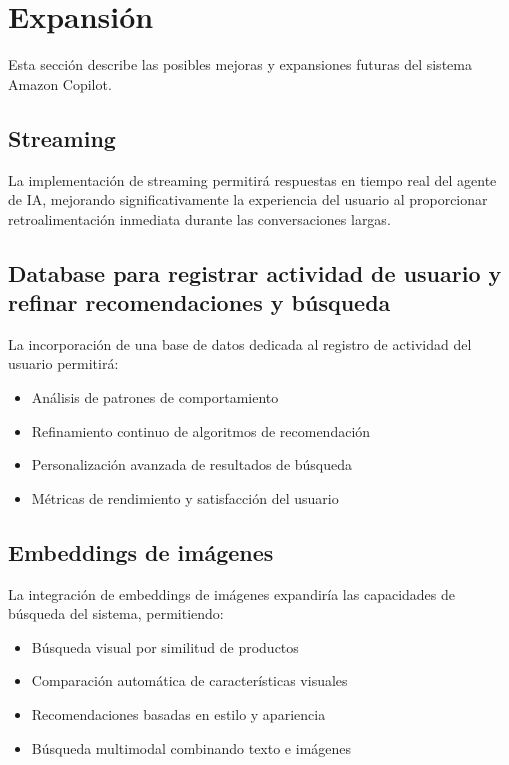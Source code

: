 \section{Expansión}

Esta sección describe las posibles mejoras y expansiones futuras del sistema Amazon Copilot.

\subsection{Streaming}

La implementación de streaming permitirá respuestas en tiempo real del agente de IA, mejorando significativamente la experiencia del usuario al proporcionar retroalimentación inmediata durante las conversaciones largas.

\subsection{Database para registrar actividad de usuario y refinar recomendaciones y búsqueda}

La incorporación de una base de datos dedicada al registro de actividad del usuario permitirá:

\begin{itemize}
    \item Análisis de patrones de comportamiento
    \item Refinamiento continuo de algoritmos de recomendación
    \item Personalización avanzada de resultados de búsqueda
    \item Métricas de rendimiento y satisfacción del usuario
\end{itemize}

\subsection{Embeddings de imágenes}

La integración de embeddings de imágenes expandiría las capacidades de búsqueda del sistema, permitiendo:

\begin{itemize}
    \item Búsqueda visual por similitud de productos
    \item Comparación automática de características visuales
    \item Recomendaciones basadas en estilo y apariencia
    \item Búsqueda multimodal combinando texto e imágenes
\end{itemize}

